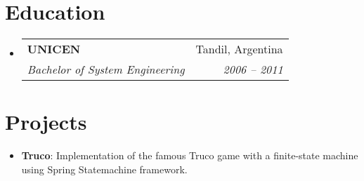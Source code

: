 \documentclass[letterpaper,11pt]{article}
\makeatletter
\newcommand{\resumeItem}[2]{
  \item\small{
    \textbf{#1}{: #2 \vspace{-2pt}}
  }
}
\newcommand{\resumeSubheading}[4]{
  \vspace{-1pt}\item
    \begin{tabular*}{0.97\textwidth}[t]{l@{\extracolsep{\fill}}r}
      \textbf{#1} & #2 \\
      \textit{\small#3} & \textit{\small #4} \\
    \end{tabular*}\vspace{-6pt}
}
\newcommand{\resumeSubItem}[2]{\resumeItem{#1}{#2}\vspace{-4pt}}
\newcommand{\resumeSubHeadingListStart}{\begin{itemize}[leftmargin=*]}
\newcommand{\resumeSubHeadingListEnd}{\end{itemize}}
\makeatother
\begin{document}
\section{Education}
  \resumeSubHeadingListStart
    \resumeSubheading
      {UNICEN}{Tandil, Argentina}
      {Bachelor of System Engineering}{2006 -- 2011}
  \resumeSubHeadingListEnd

\section{Projects}
  \resumeSubHeadingListStart
    \resumeSubItem{Truco}
      {Implementation of the famous Truco game with a finite-state machine using Spring Statemachine framework.}
  \resumeSubHeadingListEnd
\end{document}
